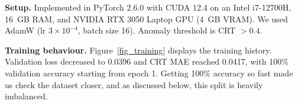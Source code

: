 \documentclass[preprint,12pt]{elsarticle}
\begin{document}
\begin{table}[H]
\caption{Data used in our experiments.}
\centering
\label{table_datasets}
\end{table}

\textbf{Setup.} Implemented in PyTorch 2.6.0 with CUDA 12.4 on an Intel i7-12700H, 16~GB RAM, and NVIDIA RTX 3050 Laptop GPU (4~GB VRAM). We used AdamW (lr $3 \times 10^{-4}$, batch size 16). Anomaly threshold is CRT $> 0.4$.

\textbf{Training behaviour.} Figure~\ref{fig_training} displays the training history. Validation loss decreased to 0.0396 and CRT MAE reached 0.0417, with 100\% validation accuracy starting from epoch 1. Getting 100\% accuracy so fast made us check the dataset closer, and as discussed below, this split is heavily imbalanced.
\end{document}

